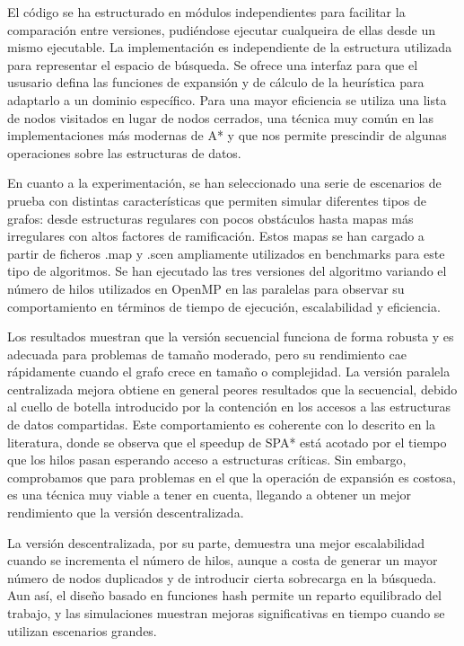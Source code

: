 \documentclass[a4paper,12pt]{article}
\begin{document}
El código se ha estructurado en módulos independientes para facilitar la comparación entre versiones, pudiéndose ejecutar cualqueira de ellas desde un mismo ejecutable. La implementación es independiente de la estructura utilizada para representar el espacio de búsqueda. Se ofrece una interfaz para que el ususario defina las funciones de expansión y de cálculo de la heurística para adaptarlo a un dominio específico. Para una mayor eficiencia se utiliza una lista de nodos visitados en lugar de nodos cerrados, una técnica muy común en las implementaciones más modernas de A* y que nos permite prescindir de algunas operaciones sobre las estructuras de datos.

En cuanto a la experimentación, se han seleccionado una serie de escenarios de prueba con distintas características que permiten simular diferentes tipos de grafos: desde estructuras regulares con pocos obstáculos hasta mapas más irregulares con altos factores de ramificación. Estos mapas se han cargado a partir de ficheros .map y .scen ampliamente utilizados en benchmarks para este tipo de algoritmos. Se han ejecutado las tres versiones del algoritmo variando el número de hilos utilizados en OpenMP en las paralelas para observar su comportamiento en términos de tiempo de ejecución, escalabilidad y eficiencia.

Los resultados muestran que la versión secuencial funciona de forma robusta y es adecuada para problemas de tamaño moderado, pero su rendimiento cae rápidamente cuando el grafo crece en tamaño o complejidad. La versión paralela centralizada mejora obtiene en general peores resultados que la secuencial, debido al cuello de botella introducido por la contención en los accesos a las estructuras de datos compartidas. Este comportamiento es coherente con lo descrito en la literatura, donde se observa que el speedup de SPA* está acotado por el tiempo que los hilos pasan esperando acceso a estructuras críticas. Sin embargo, comprobamos que para problemas en el que la operación de expansión es costosa, es una técnica muy viable a tener en cuenta, llegando a obtener un mejor rendimiento que la versión descentralizada.

La versión descentralizada, por su parte, demuestra una mejor escalabilidad cuando se incrementa el número de hilos, aunque a costa de generar un mayor número de nodos duplicados y de introducir cierta sobrecarga en la búsqueda. Aun así, el diseño basado en funciones hash permite un reparto equilibrado del trabajo, y las simulaciones muestran mejoras significativas en tiempo cuando se utilizan escenarios grandes.
\end{document}
